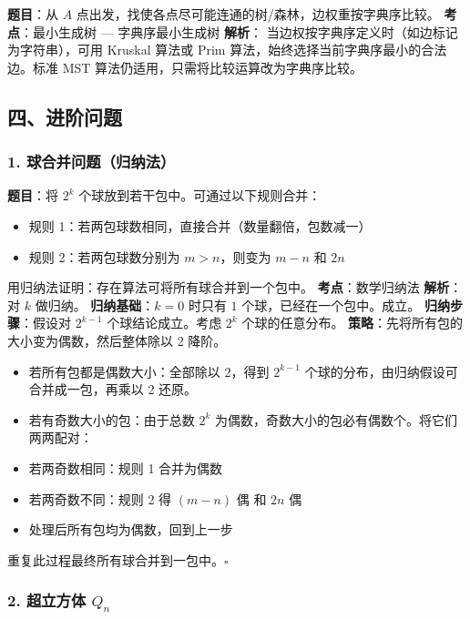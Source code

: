 \documentclass[10pt,a4paper,openany]{ctexbook}
\theoremstyle{definition}
\theoremstyle{remark}
\begin{document}
\textbf{题目}：从 $A$ 点出发，找使各点尽可能连通的树/森林，边权重按字典序比较。
\textbf{考点}：最小生成树 — 字典序最小生成树
\textbf{解析}：
当边权按字典序定义时（如边标记为字符串），可用 Kruskal 算法或 Prim 算法，始终选择当前字典序最小的合法边。标准 MST 算法仍适用，只需将比较运算改为字典序比较。
\vspace{-2pt}

\subsection{四、进阶问题}

\subsubsection{1. 球合并问题（归纳法）}

\textbf{题目}：将 $2^k$ 个球放到若干包中。可通过以下规则合并：
\begin{itemize}
\item 规则 1：若两包球数相同，直接合并（数量翻倍，包数减一）
\item 规则 2：若两包球数分别为 $m > n$，则变为 $m-n$ 和 $2n$

\end{itemize}

用归纳法证明：存在算法可将所有球合并到一个包中。
\textbf{考点}：数学归纳法
\textbf{解析}：
对 $k$ 做归纳。
\textbf{归纳基础}：$k=0$ 时只有 $1$ 个球，已经在一个包中。成立。
\textbf{归纳步骤}：假设对 $2^{k-1}$ 个球结论成立。考虑 $2^k$ 个球的任意分布。
\textbf{策略}：先将所有包的大小变为偶数，然后整体除以 2 降阶。
\begin{itemize}
\item 若所有包都是偶数大小：全部除以 2，得到 $2^{k-1}$ 个球的分布，由归纳假设可合并成一包，再乘以 2 还原。
\item 若有奇数大小的包：由于总数 $2^k$ 为偶数，奇数大小的包必有偶数个。将它们两两配对：
\item 若两奇数相同：规则 1 合并为偶数
\item 若两奇数不同：规则 2 得 $(m-n)$ 偶 和 $2n$ 偶
\item 处理后所有包均为偶数，回到上一步

\end{itemize}

重复此过程最终所有球合并到一包中。$\square$
\vspace{-2pt}

\subsubsection{2. 超立方体 $Q_n$}
\end{document}
